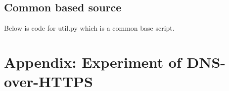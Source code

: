 \documentclass[a4paper,12pt]{article}
\begin{document}
\subsection{Common based source}
Below is code for util.py which is a common base script.
\newpage

\section{Appendix: Experiment of DNS-over-HTTPS}\label{protocol-verification}

\end{document}
